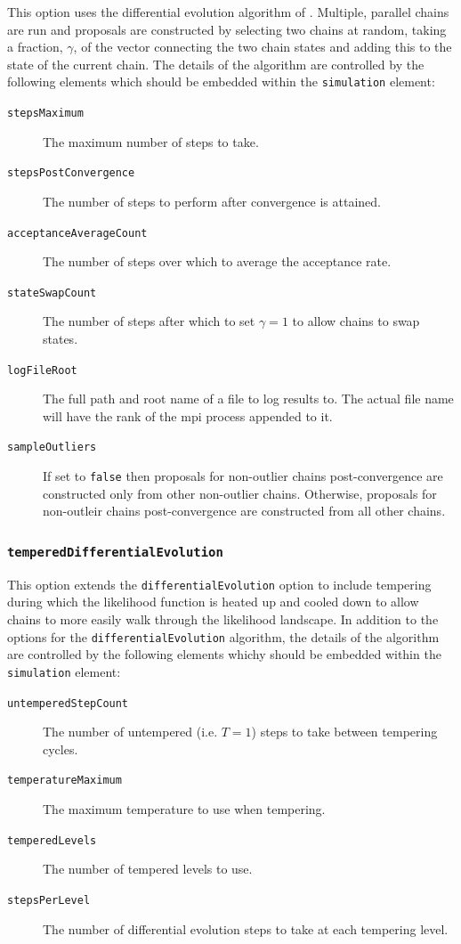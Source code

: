 This option uses the differential evolution algorithm of \cite{terr_braak_markov_2006}. Multiple, parallel chains are run and proposals are constructed by selecting two chains at random, taking a fraction, $\gamma$, of the vector connecting the two chain states and adding this to the state of the current chain. The details of the algorithm are controlled by the following elements which should be embedded within the {\tt simulation} element:
\begin{description}
\item[{\tt stepsMaximum}] The maximum number of steps to take.
\item[{\tt stepsPostConvergence}] The number of steps to perform after convergence is attained.
\item[{\tt acceptanceAverageCount}] The number of steps over which to average the acceptance rate.
\item[{\tt stateSwapCount}] The number of steps after which to set $\gamma=1$ to allow chains to swap states.
\item[{\tt logFileRoot}] The full path and root name of a file to log results to. The actual file name will have the rank of the \gls{mpi} process appended to it.
\item[{\tt sampleOutliers}] If set to {\tt false} then proposals for non-outlier chains post-convergence are constructed only from other non-outlier chains. Otherwise, proposals for non-outleir chains post-convergence are constructed from all other chains.
\end{description}

\subsubsection{{\tt temperedDifferentialEvolution}}

This option extends the {\tt differentialEvolution} option to include tempering during which the likelihood function is heated up and cooled down to allow chains to more easily walk through the likelihood landscape. In addition to the options for the {\tt differentialEvolution} algorithm, the details of the algorithm are controlled by the following elements whichy should be embedded within the {\tt simulation} element:
\begin{description}
\item[{\tt untemperedStepCount}] The number of untempered (i.e. $T=1$) steps to take between tempering cycles.
\item[{\tt temperatureMaximum}] The maximum temperature to use when tempering.
\item[{\tt temperedLevels}] The number of tempered levels to use.
\item[{\tt stepsPerLevel}] The number of differential evolution steps to take at each tempering level.
\end{description}


